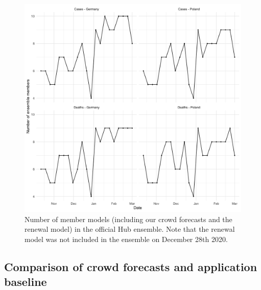 \documentclass[
]{article}
\providecommand{\DIFaddbegin}{} %
\newcommand{\DIFaddincludegraphics}[2][]{{\color{blue}\fbox{\DIFOincludegraphics[#1]{#2}}}} %
\DeclareRobustCommand{\DIFaddbegin}{\DIFOaddbegin \let\includegraphics\DIFaddincludegraphics} %
\begin{document}
\begin{figure}[H]
\includegraphics[width=1\linewidth,]{../analysis/plots/ensemble-members} \caption{Number of member models (including our crowd forecasts and the renewal model) in the official Hub ensemble. Note that the renewal model was not included in the ensemble on December 28th 2020.}\label{fig:num-ensemble-members}
\end{figure}

\clearpage

\DIFaddbegin \hypertarget{comparison-of-crowd-forecasts-and-application-baseline}{%
\subsection{Comparison of crowd forecasts and application baseline}\label{comparison-of-crowd-forecasts-and-application-baseline}}
\end{document}
